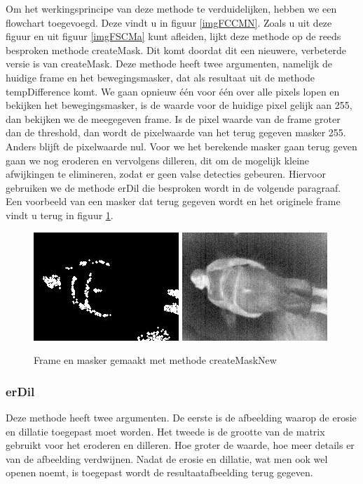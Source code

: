 Om het werkingsprincipe van deze methode te verduidelijken, hebben we een flowchart toegevoegd. Deze vindt u in figuur \ref{imgFCCMN}. Zoals u uit deze figuur en uit figuur \ref{imgFSCMa} kunt afleiden, lijkt deze methode op de reeds besproken methode createMask. Dit komt doordat dit een nieuwere, verbeterde versie is van createMask. Deze methode heeft twee argumenten, namelijk de huidige frame en het bewegingsmasker, dat als resultaat uit de methode tempDifference komt. We gaan opnieuw \'e\'en voor \'e\'en over alle pixels lopen en bekijken het bewegingsmasker, is de waarde voor de huidige pixel gelijk aan 255, dan bekijken we de meegegeven frame. Is de pixel waarde van de frame groter dan de threshold, dan wordt de pixelwaarde van het terug gegeven masker 255. Anders blijft de pixelwaarde nul. Voor we het berekende masker gaan terug geven gaan we nog eroderen en vervolgens dilleren, dit om de mogelijk kleine afwijkingen te elimineren, zodat er geen valse detecties gebeuren. Hiervoor gebruiken we de methode erDil die besproken wordt in de volgende paragraaf. Een voorbeeld van een masker dat terug gegeven wordt en het originele frame vindt u terug in figuur \ref{imgCMN}.
\begin{figure}[hbp]
	\includegraphics[scale=0.65]{MaskMetDif}
	\includegraphics[scale=0.65]{ImgMetDif}
	\caption{Frame en masker gemaakt met methode createMaskNew}
	\label{imgCMN}
\end{figure} 
 
 \subsubsection{erDil}
Deze methode heeft twee argumenten. De eerste is de afbeelding waarop de erosie en dillatie toegepast moet worden. Het tweede is de grootte van de matrix gebruikt voor het eroderen en dilleren. Hoe groter de waarde, hoe meer details er van de afbeelding verdwijnen. Nadat de erosie en dillatie, wat men ook wel openen noemt, is toegepast wordt de resultaatafbeelding terug gegeven. 
 
